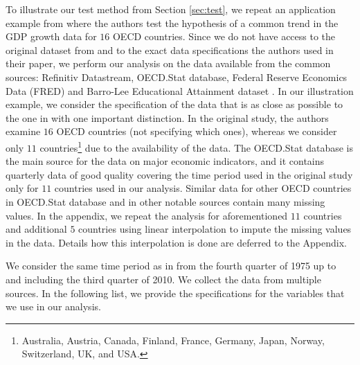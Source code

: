 \documentclass[a4paper,12pt]{article}
\begin{document}
To illustrate our test method from Section \ref{sec:test}, we repeat an application example from \cite{Zhang2012} where the authors test the hypothesis of a common trend in the GDP growth data for $16$ OECD countries. Since we do not have access to the original dataset from \cite{Zhang2012} and to the exact data specifications the authors used in their paper, we perform our analysis on the data available from the common sources: Refinitiv Datastream, OECD.Stat database, Federal Reserve Economics Data (FRED) and Barro-Lee Educational Attainment dataset \citep*{Barro2013}. In our illustration example, we consider the specification of the data that is as close as possible to the one in \linebreak \cite{Zhang2012} with one important distinction. In the original study, the authors examine $16$ OECD countries (not specifying which ones), whereas we consider only $11$ countries\footnote{Australia, Austria, Canada, Finland, France, Germany, Japan, Norway, Switzerland, UK, and USA.} due to the availability of the data. The OECD.Stat database is the main source for the data on major economic indicators, and it contains  quarterly data of good quality covering the time period used in the original study only for $11$ countries used in our analysis. Similar data for other OECD countries in OECD.Stat database and in other notable sources contain many missing values. In the appendix, we repeat the analysis for aforementioned $11$ countries and additional $5$ countries using linear interpolation to impute the missing values in the data. Details how this interpolation is done are deferred to the Appendix.

We consider the same time period as in \cite{Zhang2012} from the fourth quarter of 1975 up to and including the third quarter of 2010. We collect the data from multiple sources. In the following list, we provide the specifications for the variables that we use in our analysis.
\end{document}
